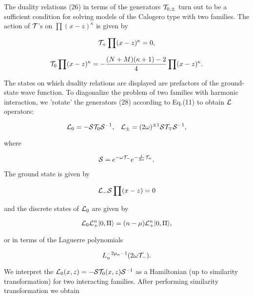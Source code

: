 \documentclass[a4paper,preprint,aps]{revtex4}
\begin{document}
 The duality relations (26) in terms of the generators ${\cal T}_{0,\pm}$
 turn out to be a sufficient condition for solving models of the Calogero type
 with two families. The action of ${\cal T}$'s on $\prod (x-z)^{\kappa}$ is
 given by


\begin{equation}
	{\cal T_{+}}\prod (x-z)^{\kappa}=0 ,
\end{equation}

\begin{equation}
	{\cal T_{\rm 0}}\prod (x-z)^{\kappa}=-\frac{(N+M)(\kappa+1)-2}{4}
	\prod (x-z)^{\kappa} .
\end{equation}

The states on which duality relations are displayed are prefactors of the
 ground-state wave function. To diagonalize the problem of two families with
 harmonic interaction, we 'rotate' the generators (28) according to Eq.(11)
 to obtain ${\cal L}$ operators:


\begin{equation}
	{\cal L}_{0}=-{\cal S}{\cal T}_{0}{\cal S}^{-1},\;\;\;
	{\cal L}_{\pm}=(2\omega)^{\pm 1}{\cal S}{\cal T}_{\mp}{\cal S}^{-1} ,
\end{equation}

where


\begin{equation}
	{\cal S}=e^{-\omega {\cal T}_{-}} e^{-\frac{1}{2\omega} {\cal T}_{+}} .
\end{equation}

The ground state is given by


\begin{equation}
	{\cal L}_{-} {\cal S} \prod (x-z)=0 
\end{equation}

and the discrete states of ${\cal L}_{0}$ are given by
 

\begin{equation}
	{\cal L}_{0} {\cal L}_{+}^{n} |0,\Pi \rangle =
 	(n-\mu) {\cal L}_{+}^{n} |0,\Pi \rangle ,
\end{equation}

or in terms of the Laguerre polynomials


\begin{equation}
	L_{n}^{-2\mu_{\kappa}-1}(2\omega{\cal T}_{-}) .
\end{equation}

We interpret the ${\cal L}_{0}(x,z)=-{\cal S}{\cal T}_{0}(x,z){\cal S}^{-1}$
 as a Hamiltonian (up to similarity transformation) for two interacting
 families. After performing similarity transformation we obtain
\end{document}
